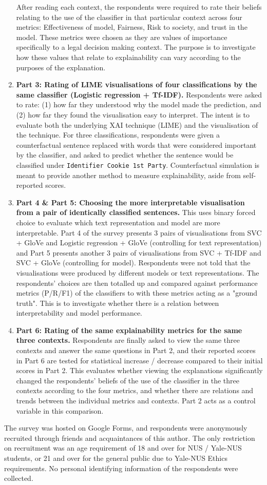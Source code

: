 \begin{enumerate}
	After reading each context, the respondents were required to rate their beliefs relating to the use of the classifier in that particular context across four metrics: Effectiveness of model, Fairness, Risk to society, and trust in the model. These metrics were chosen as they are values of importance specifically to a legal decision making context. The purpose is to investigate how these values that relate to explainability can vary according to the purposes of the explanation.
	\item \textbf{Part 3: Rating of LIME visualisations of four classifications by the same classifier (Logistic regression + Tf-IDF).} Respondents were asked to rate: (1) how far they understood why the model made the prediction, and (2) how far they found the visualisation easy to interpret. The intent is to evaluate both the underlying XAI technique (LIME) and the visualisation of the technique. For three classifications, respondents were given a counterfactual sentence replaced with words that were considered important by the classifier, and asked to predict whether the sentence would be classified under \texttt{Identifier Cookie 1st Party}. Counterfactual simulation is meant to provide another method to measure explainability, aside from self-reported scores.
	\item \textbf{Part 4 \& Part 5: Choosing the more interpretable visualisation from a pair of identically classified sentences.} This uses binary forced choice to evaluate which text representation and model are more interpretable. Part 4 of the survey presents 3 pairs of visualisations from SVC + GloVe and Logistic regression + GloVe (controlling for text representation) and Part 5 presents another 3 pairs of visualisations from SVC + Tf-IDF and SVC + GloVe (controlling for model). Respondents were not told that the visualisations were produced by different models or text representations. The respondents' choices are then totalled up and compared against performance metrics (P/R/F1) of the classifiers to with these metrics acting as a "ground truth". This is to investigate whether there is a relation between interpretability and model performance.
	\item \textbf{Part 6: Rating of the same explainability metrics for the same three contexts.} Respondents are finally asked to view the same three contexts and answer the same questions in Part 2, and their reported scores in Part 6 are tested for statistical increase / decrease compared to their initial scores in Part 2. This evaluates whether viewing the explanations significantly changed the respondents' beliefs of the use of the classifier in the three contexts according to the four metrics, and whether there are relations and trends between the individual metrics and contexts. Part 2 acts as a control variable in this comparison.
\end{enumerate}

The survey was hosted on Google Forms, and respondents were anonymously recruited through friends and acquaintances of this author. The only restriction on recruitment was an age requirement of 18 and over for NUS / Yale-NUS students, or 21 and over for the general public due to Yale-NUS Ethics requirements. No personal identifying information of the respondents were collected.